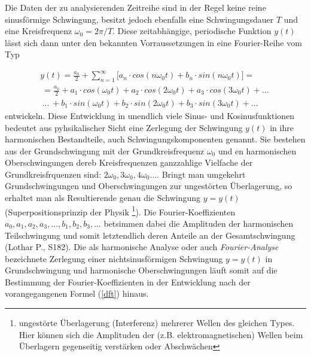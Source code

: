 \documentclass[11pt]{report}
\begin{document}
Die Daten der zu analysierenden Zeitreihe sind in der Regel keine reine sinusförmige Schwingung, besitzt jedoch ebenfalls eine Schwingungsdauer $T$ und eine Kreisfrequenz $\omega_0=2\pi / T$. Diese zeitabhängige, periodische Funktion $y(t)$ lässt sich dann unter den bekannten Vorraussetzungen in eine Fourier-Reihe vom Typ

\begin{equation} \label{dft}
\begin{split}
y(t) =\frac{a_0}{2}+\sum_{n=1}^{\infty} \lbrack a_n \cdot cos(n \omega_0 t) + b_n \cdot sin(n \omega_0 t) \rbrack = \\\
= \frac{a_0}{2}+a_1 \cdot cos(\omega_0 t) + a_2 \cdot cos(2 \omega_0 t) + a_3 \cdot cos(3 \omega_0 t) + \dots \ \\\
\dots \ + b_1 \cdot sin(\omega_0 t) + b_2 \cdot sin(2 \omega_0 t) + b_3 \cdot sin(3 \omega_0 t) + \dots\ 
\end{split}
\end{equation}
entwickeln. Diese Entwicklung in unendlich viele Sinus- und Kosinusfunktionen bedeutet aus pyhsikalischer Sicht eine Zerlegung der Schwingung $y(t)$ in ihre harmonischen Bestandteile, auch Schwingungskomponenten genannt. Sie bestehen aus der Grundschwingung mit der Grundkreisfrequenz $\omega_0$ und en harmonischen Oberschwingungen dereb Kreisfrequenzen ganzzahlige Vielfache der Grundkreisfrquenzen sind: $2\omega_0, 3\omega_0, 4\omega_0 \dots $. Bringt man umgekehrt Grundschwingungen und Oberschwingungen zur ungestörten Überlagerung, so erhaltet man als Resultierende genau die Schwingung $y = y(t)$ (Superpositionsprinzip der Physik \footnote{ungestörte Überlagerung (Interferenz) mehrerer Wellen des gleichen Types. Hier können sich die Amplituden der (z.B. elektromagnetischen) Wellen beim Überlagern gegenseitig verstärken oder Abschwächen}). Die Fourier-Koeffizienten $a_0, a_1, a_2, a_3, \dots, b_1, b_2, b_3, \dots $ betsimmen dabei die Amplituden der harmonischen Teilschwingung und somit letztendlich deren Anteile an der Gesamtschwingung (Lothar P., S182). Die als harmonische Analyse oder auch \emph{Fourier-Analyse} bezeichnete Zerlegung einer nichtsinusförmigen Schwingung $y=y(t)$ in Grundschwingung und harmonische Oberschwingungen läuft somit auf die Bestimmung der Fourier-Koeffizienten in der Entwicklung nach der vorangegangenen Formel (\ref{dft}) hinaus. 
\end{document}
